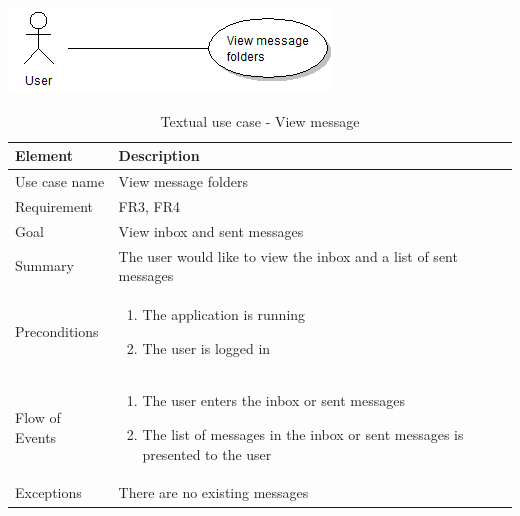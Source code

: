 \begin{table}
\begin{center}
\begin{center}
\includegraphics[width=\textwidth]{view_message_folders}
\end{center}
\begin{tabular}{p{3cm}|p{12cm}} \hline
\textbf{Element} & \textbf{Description} \\ \hline \hline
Use case name & View message folders \\ 
Requirement & FR3, FR4 \\
Goal & View inbox and sent messages \\ 
Summary &The user would like to view the inbox and a list of sent messages \\ \hline
Preconditions &
\begin{enumerate}
\item{}The application is running
\item{}The user is logged in
\end{enumerate} \\ \hline
Flow of Events &
\begin{enumerate}
\item{}The user enters the inbox or sent messages
\item{}The list of messages in the inbox or sent messages is presented to the user
\end{enumerate} \\ \hline
Exceptions & There are no existing messages\\ \hline
\end{tabular}
\end{center}
\caption{Textual use case - View message} \label{tab:viewmessagefolders}
\end{table}


